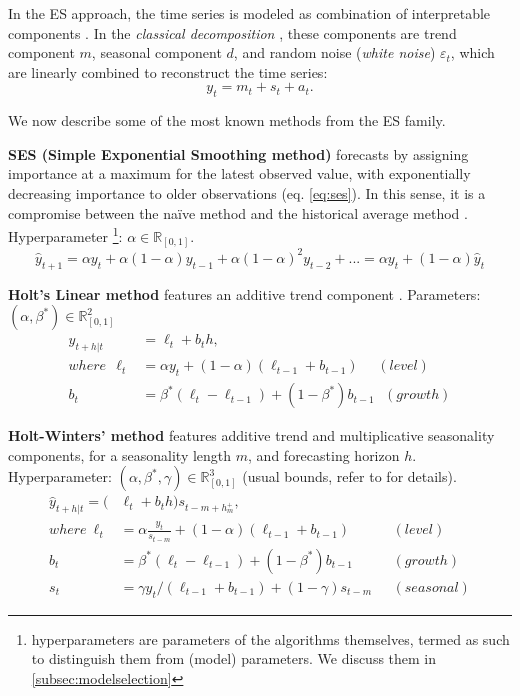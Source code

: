 In the ES approach, the time series is modeled as combination of  interpretable components \cite{brockwell1990methods}.
In the \textit{classical decomposition} \cite{makridakis1997arma}, these components are trend component $m$, seasonal component $d$, and random noise (\textit{white noise}) $\varepsilon_t$, which are linearly combined to reconstruct the time series:
\begin{equation}\label{eq:ts_classical_decomp}
    y_t = m_t + s_t + a_t .
\end{equation}

We now describe some of the most known methods from the ES family.

\noindent
\textbf{SES (Simple Exponential Smoothing method)} forecasts by assigning importance at a maximum for the latest observed value, with exponentially decreasing importance to older observations (eq. \ref{eq:ses}).
In this sense, it is a compromise between the naïve method and the historical average method \cite{hyndman2018principles}.
Hyperparameter \footnote[1]{hyperparameters are parameters of the algorithms themselves, termed as such to distinguish them from (model) parameters. We discuss them in \ref{subsec:modelselection}}: $\alpha \in \mathbb{R}_{[0,1]}$.
\begin{equation}\label{eq:ses}
    \hat{y}_{t+1} = \alpha y_{t} + \alpha (1-\alpha) y_{t-1} + \alpha (1-\alpha)^2 y_{t-2} + ... = \alpha y_{t} + (1-\alpha) \hat{y}_{t}
\end{equation}

\noindent
\textbf{Holt's Linear method} features an additive trend component \cite{hyndman2008es}. Parameters: $(\alpha, \beta^*) \in \mathbb{R}^2_{[0,1]}$
\begin{equation}\label{eq:holt_linear}
    \begin{aligned}
    \hat{y}_{t+h|t} &= \ell_t + b_th, \\
    where\ \  \ell_t &= \alpha y_t + (1-\alpha)(\ell_{t-1}+b_{t-1}) \ \ \ \ \ \ (level) \\
    b_t &= \beta^*(\ell_t - \ell_{t-1}) + (1-\beta^*)b_{t-1} \ \ \ (growth)
    \end{aligned}
\end{equation}

\newpage
\noindent
\textbf{Holt-Winters' method} features additive trend and multiplicative seasonality components, for a seasonality length $m$, and forecasting horizon $h$.
Hyperparameter: $(\alpha, \beta^*,\gamma) \in \mathbb{R}^3_{[0,1]}$ (usual bounds, refer to \cite{hyndman2008es} for details).
\begin{equation}\label{eq:hs_method}
    \begin{aligned}
    \hat{y}_{t+h|t} = (&\ell_t + b_th)s_{t-m+h^+_m}, \\
    where \ \ell_t &= \alpha \frac{y_t}{s_{t-m}} + (1-\alpha)(\ell_{t-1}+b_{t-1})   &(level) \\
    b_t &= \beta^*(\ell_t - \ell_{t-1}) + (1-\beta^*)b_{t-1} &(growth) \\
    s_t &= \gamma y_t/(\ell_{t-1}+b_{t-1}) + (1-\gamma)s_{t-m} \ \ \ &(seasonal)
    \end{aligned}
\end{equation}

